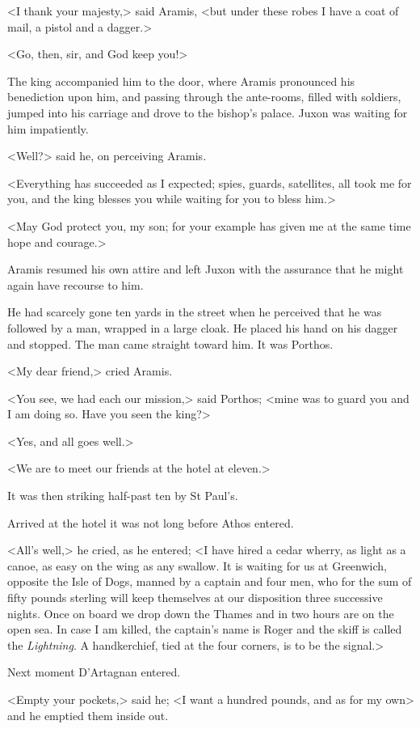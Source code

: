 <I thank your majesty,> said Aramis, <but under these robes I have a coat of mail, a pistol and a dagger.>

<Go, then, sir, and God keep you!>

The king accompanied him to the door, where Aramis pronounced his benediction upon him, and passing through the ante-rooms, filled with soldiers, jumped into his carriage and drove to the bishop's palace. Juxon was waiting for him impatiently.

<Well?> said he, on perceiving Aramis.

<Everything has succeeded as I expected; spies, guards, satellites, all took me for you, and the king blesses you while waiting for you to bless him.>

<May God protect you, my son; for your example has given me at the same time hope and courage.>

Aramis resumed his own attire and left Juxon with the assurance that he might again have recourse to him.

He had scarcely gone ten yards in the street when he perceived that he was followed by a man, wrapped in a large cloak. He placed his hand on his dagger and stopped. The man came straight toward him. It was Porthos.

<My dear friend,> cried Aramis.

<You see, we had each our mission,> said Porthos; <mine was to guard you and I am doing so. Have you seen the king?>

<Yes, and all goes well.>

<We are to meet our friends at the hotel at eleven.>

It was then striking half-past ten by St Paul's.

Arrived at the hotel it was not long before Athos entered.

<All's well,> he cried, as he entered; <I have hired a cedar wherry, as light as a canoe, as easy on the wing as any swallow. It is waiting for us at Greenwich, opposite the Isle of Dogs, manned by a captain and four men, who for the sum of fifty pounds sterling will keep themselves at our disposition three successive nights. Once on board we drop down the Thames and in two hours are on the open sea. In case I am killed, the captain's name is Roger and the skiff is called the \textit{Lightning}. A handkerchief, tied at the four corners, is to be the signal.>

Next moment D'Artagnan entered.

<Empty your pockets,> said he; <I want a hundred pounds, and as for my own\longdash> and he emptied them inside out.


